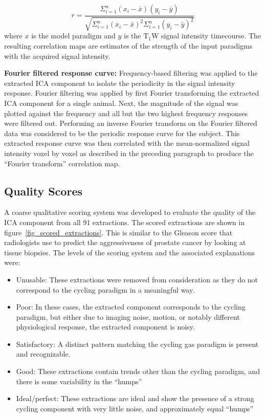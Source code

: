 \begin{equation}
r = \frac{\Sigma^n_{i=1} (x_i - \bar{x}) (y_i - \bar{y})}{\sqrt{\Sigma^n_{i=1} (x_i - \bar{x})^2 \Sigma^n_{i=1} (y_i - \bar{y})^2}}
\end{equation}
where $x$ is the model paradigm and $y$ is the T$_1$W signal intensity timecourse.
The resulting correlation maps are estimates of the strength of the input paradigms with the acquired signal intensity.

\noindent\textbf{Fourier filtered response curve:} Frequency-based filtering was applied to the extracted ICA component to isolate the periodicity in the signal intensity response.
Fourier filtering was applied by first Fourier transforming the extracted ICA component for a single animal. 
Next, the magnitude of the signal was plotted against the frequency and all but the two highest frequency responses were filtered out.
Performing an inverse Fourier transform on the Fourier filtered data was considered to be the periodic response curve for the subject.
This extracted response curve was then correlated with the mean-normalized signal intensity voxel by voxel as described in the preceding paragraph to produce the ``Fourier transform'' correlation map.

\subsection{Quality Scores}

A coarse qualitative scoring system was developed to evaluate the quality of the ICA component from all 91 extractions.
The scored extractions are shown in figure~\ref{fig_scored_extractions}.
This is similar to the Gleason score that radiologists use to predict the aggressiveness of prostate cancer by looking at tissue biopsies.
The levels of the scoring system and the associated explanations were:

\begin{itemize}
\item Unusable: These extractions were removed from consideration as they do not correspond to the cycling paradigm in a meaningful way.
\item Poor: In these cases, the extracted component corresponds to the cycling paradigm, but either due to imaging noise, motion, or notably different physiological response, the extracted component is noisy.
\item Satisfactory: A distinct pattern matching the cycling gas paradigm is present and recognizable.
\item Good: These extractions contain trends other than the cycling paradigm, and there is some variability in the ``humps'' 
\item Ideal/perfect: These extractions are ideal and show the presence of a strong cycling component with very little noise, and approximately equal ``humps''
\end{itemize}

